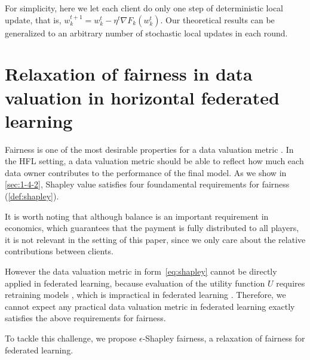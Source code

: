 For simplicity, here we let each client do only one step of deterministic local update, that is, $w_k^{t+1} = w_k^t - \eta^t \nabla F_k(w_k^t)$. Our theoretical results can be generalized to an arbitrary number of stochastic local updates in each round. 

\section{Relaxation of fairness in data valuation in horizontal federated learning} \label{sec:7-4}

Fairness is one of the most desirable properties for a data valuation metric \cite{ghorbani2019data,pei2020survey}. In the HFL setting, a data valuation metric should be able to reflect how much each data owner contributes to the performance of the final model. As we show in \autoref{sec:1-4-2}, Shapley value satisfies four foundamental requirements for fairness (\autoref{def:shapley}). 

It is worth noting that although balance is an important requirement in economics, which guarantees that the payment is fully distributed to all players, it is not relevant in the setting of this paper, since we only care about the relative contributions between clients. 

However the data valuation metric in form~\eqref{eq:shapley} cannot be directly applied in federated learning, because evaluation of the utility function $U$ requires retraining models \cite{ghorbani2019data}, which is impractical in federated learning \cite{wang2020principled}. Therefore, we cannot expect any practical data valuation metric in federated learning exactly satisfies the above requirements for fairness.

To tackle this challenge, we propose $\epsilon$-Shapley fairness, a relaxation of fairness for federated learning.

